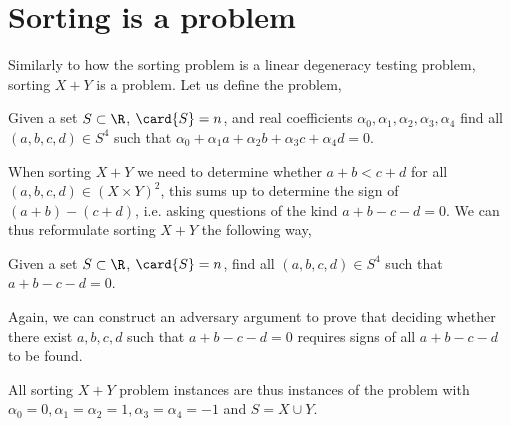 \section{Sorting \XY is a \fourLDT problem}

Similarly to how the sorting problem is a linear degeneracy testing problem,
sorting $X+Y$ is a \fourLDT problem. Let us define the \fourLDT problem,

\begin{problem}
Given a set $S \subset \R$, $\card{S} = n$, and real coefficients $\alpha_0,
\alpha_1, \alpha_2, \alpha_3, \alpha_4$ find all $(a,b,c,d) \in S^4$ such that
$\alpha_0 + \alpha_1 a + \alpha_2 b + \alpha_3 c + \alpha_4 d = 0$.
\end{problem}

When sorting $X+Y$ we need to determine whether $a + b < c + d$ for all
$(a,b,c,d) \in (X \times Y)^2$, this sums up to determine the sign of $(a+b) -
(c+d)$, i.e. asking questions of the kind $a + b - c - d = 0$. We can thus
reformulate sorting $X+Y$ the following way,

\begin{problem}
Given a set $S \subset \R$, $\card{S} = n$, find all $(a,b,c,d) \in S^4$ such
that $a + b - c - d = 0$.
\end{problem}

Again, we can construct an adversary argument to prove that deciding whether
there exist \(a,b,c,d\) such that \(a+b-c-d=0\) requires signs of all
\(a+b-c-d\) to be found.

All sorting $X+Y$ problem instances are thus instances of the \fourLDT problem
with $\alpha_0 = 0, \alpha_1 = \alpha_2 = 1, \alpha_3 = \alpha_4 = -1$ and
$S = X \cup Y$.

